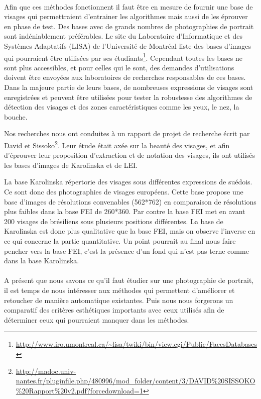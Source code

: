 \documentclass[11pt, french]{report-rd-info}
\begin{document}
\paragraph*{}
Afin que ces méthodes fonctionnent il faut être en mesure de fournir une base de visages qui permettraient d’entrainer les algorithmes mais aussi de les éprouver en phase de test.
Des bases avec de grands nombres de photographies de portrait sont indéniablement préférables. Le site du Laboratoire d'Informatique et des Systèmes Adaptatifs (LISA) de l'Université de Montréal liste des bases d'images qui pourraient être utilisées par ses étudiants\footnote{\url{http://www.iro.umontreal.ca/~lisa/twiki/bin/view.cgi/Public/FacesDatabases}}. Cependant toutes les bases ne sont plus accessibles, et pour celles qui le sont, des demandes d'utilisations doivent être envoyées aux laboratoires de recherches responsables de ces bases. Dans la majeure partie de leurs bases, de nombreuses expressions de visages sont enregistrées et peuvent être utilisées pour tester la robustesse des algorithmes de détection des visages et des zones caractéristiques comme les yeux, le nez, la bouche.


Nos recherches nous ont conduites à un rapport de projet de recherche écrit par David et Sissoko\footnote{\url{http://madoc.univ-nantes.fr/pluginfile.php/480996/mod_folder/content/3/DAVID\%20SISSOKO\%20Rapport\%20v2.pdf?forcedownload=1}}. Leur étude était axée sur la beauté des visages, et afin d'éprouver leur proposition d'extraction et de notation des visages, ils ont utilisés les bases d'images de Karolinska et de LEI.


La base Karolinska répertorie des visages sous différentes expressions de suédois. Ce sont donc des photographies de visages européens. Cette base propose une base d'images de résolutions convenables (562*762) en comparaison de résolutions plus faibles dans la base FEI de 260*360. Par contre la base FEI met en avant 200 visages de brésiliens sous plusieurs positions différentes. La base de Karolinska est donc plus qualitative que la base FEI, mais on observe l'inverse en ce qui concerne la partie quantitative. Un point pourrait au final nous faire pencher vers la base FEI, c'est la présence d'un fond qui n'est pas terne comme dans la base Karolinska.


\paragraph*{}
A présent que nous savons ce qu'il faut étudier sur une photographie de portrait, il est temps de nous intéresser aux méthodes qui permettent d'améliorer et retoucher de manière automatique existantes. Puis nous nous forgerons un comparatif des critères esthétiques importants avec ceux utilisés afin de déterminer ceux qui pourraient manquer dans les méthodes.
\end{document}
